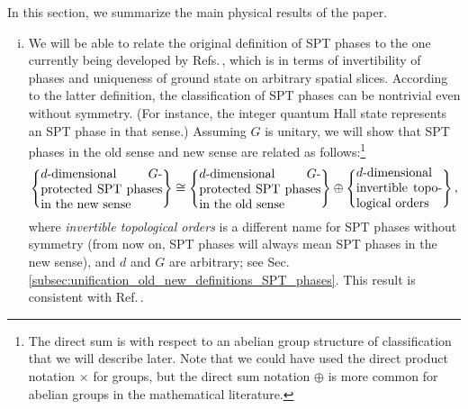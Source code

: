 \documentclass[sort&compress]{elsarticle}
\theoremstyle{theoremstyle}
\theoremstyle{framedtheoremstyle}
\theoremstyle{definitionstyle}
\theoremstyle{definitionstyle}
\theoremstyle{definitionstyle}
\theoremstyle{definitionstyle}
\theoremstyle{nameddefinitionstyle}
\theoremstyle{framednameddefinitionstyle}
\theoremstyle{proofstyle}
\theoremstyle{definitionstyle}
\newcommand{\isomorphic}{\cong}
\newcommand{\braces}[1]{\left\{ #1 \right\}}
\begin{document}
In this section, we summarize the main physical results of the paper.

\begin{enumerate}[(i)]
\item We will be able to relate the original definition of SPT phases \cite{Wen_Definition, Cirac} to the one currently being developed by Refs.\,\cite{Kitaev_Stony_Brook_2011_SRE_2, Kitaev_Stony_Brook_2013_SRE, Kapustin_Boson, Freed_SRE_iTQFT, Freed_ReflectionPositivity, McGreevy_sSourcery}, which is in terms of invertibility \cite{FreedMoore2006} of phases and uniqueness of ground state on arbitrary spatial slices. According to the latter definition, the classification of SPT phases can be nontrivial even without symmetry. (For instance, the integer quantum Hall state represents an SPT phase in that sense.) Assuming $G$ is unitary, we will show that SPT phases in the old sense and new sense are related as follows:\footnote{The direct sum is with respect to an abelian group structure of classification that we will describe later. Note that we could have used the direct product notation $\times$ for groups, but the direct sum notation $\oplus$ is more common for abelian groups in the mathematical literature.}
\begin{eqnarray}
\braces{\parbox{3.4cm}{$d$-dimensional $G$-protected SPT phases in the new sense}}
\isomorphic
\braces{\parbox{3.4cm}{$d$-dimensional $G$-protected SPT phases in the old sense}}
\oplus
\braces{\parbox{2.4cm}{$d$-dimensional invertible topological orders}},
\end{eqnarray}
where \emph{invertible topological orders} is a different name for SPT phases without symmetry (from now on, SPT phases will always mean SPT phases in the new sense), and $d$ and $G$ are arbitrary; see Sec.\,\ref{subsec:unification_old_new_definitions_SPT_phases}.
This result is consistent with Ref.\,\cite{Kapustin_Fermion}.


\end{enumerate}
\end{document}
